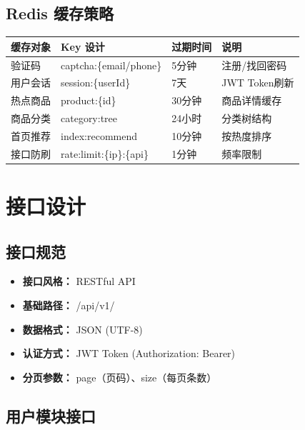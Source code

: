 \documentclass[12pt,a4paper,UTF8]{ctexart}
\begin{document}
\subsection{Redis 缓存策略}

\begin{longtable}{p{}|p{}|p{}|p{}}
    \toprule
    \textbf{缓存对象} & \textbf{Key 设计} & \textbf{过期时间} & \textbf{说明} \\
    \midrule
    \endhead
    \bottomrule
    \endfoot

    验证码 & captcha:\{email/phone\} & 5分钟 & 注册/找回密码 \\
    用户会话 & session:\{userId\} & 7天 & JWT Token刷新 \\
    热点商品 & product:\{id\} & 30分钟 & 商品详情缓存 \\
    商品分类 & category:tree & 24小时 & 分类树结构 \\
    首页推荐 & index:recommend & 10分钟 & 按热度排序 \\
    接口防刷 & rate:limit:\{ip\}:\{api\} & 1分钟 & 频率限制 \\
\end{longtable}

\section{接口设计}

\subsection{接口规范}

\begin{itemize}[itemsep=3pt]
    \item \textbf{接口风格：} RESTful API
    \item \textbf{基础路径：} /api/v1/
    \item \textbf{数据格式：} JSON (UTF-8)
    \item \textbf{认证方式：} JWT Token (Authorization: Bearer)
    \item \textbf{分页参数：} page（页码）、size（每页条数）
\end{itemize}

\subsection{用户模块接口}
\end{document}
